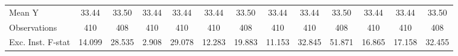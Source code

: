 {\begin{tabular}{l*{12}{c}}
\midrule
Mean Y      &       33.44         &       33.50         &       33.44         &       33.44         &       33.44         &       33.50         &       33.44         &       33.44         &       33.50         &       33.44         &       33.44         &       33.50         \\
Observations&         410         &         408         &         410         &         410         &         410         &         408         &         410         &         410         &         408         &         410         &         410         &         408         \\
Exc. Inst. F-stat&      14.099         &      28.535         &       2.908         &      29.078         &      12.283         &      19.883         &      11.153         &      32.845         &      51.871         &      16.865         &      17.158         &      32.455         \\
\bottomrule
\end{tabular}
}
